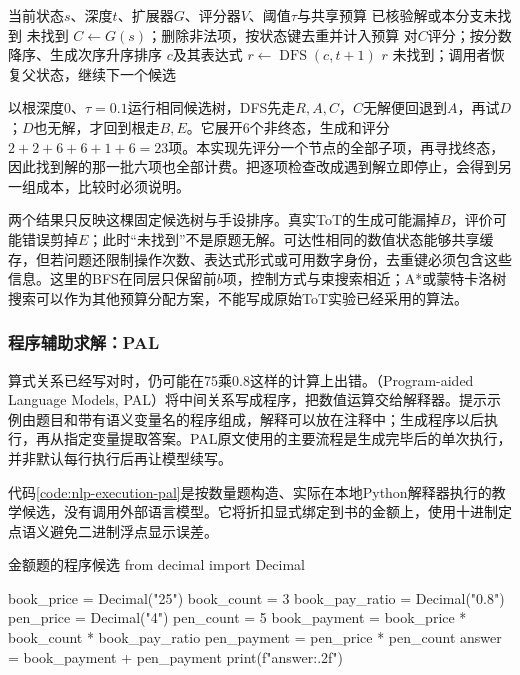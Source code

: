 \begin{algorithm}[带回溯的ToT深度优先搜索]
\label{alg:nlp-execution-tot-dfs}
\begin{algorithmic}[1]
\Require 当前状态$s$、深度$t$、扩展器$G$、评分器$V$、阈值$\tau$与共享预算
\Ensure 已核验解或本分支未找到
  \State \Return 未找到
\EndIf
\State $C\gets G(s)$；删除非法项，按状态键去重并计入预算
\State 对$C$评分；按分数降序、生成次序升序排序
    \State \Return $c$及其表达式
    \State $r\gets\operatorname{DFS}(c,t+1)$
      \State \Return $r$
    \EndIf
  \EndIf
\EndFor
\State \Return 未找到；调用者恢复父状态，继续下一个候选
\end{algorithmic}
\end{algorithm}

以根深度0、$\tau=0.1$运行相同候选树，DFS先走$R,A,C$，$C$无解便回退到$A$，再试$D$；$D$也无解，才回到根走$B,E$。它展开6个非终态，生成和评分$2+2+6+6+1+6=23$项。本实现先评分一个节点的全部子项，再寻找终态，因此找到解的那一批六项也全部计费。把逐项检查改成遇到解立即停止，会得到另一组成本，比较时必须说明。

两个结果只反映这棵固定候选树与手设排序。真实ToT的生成可能漏掉$B$，评价可能错误剪掉$E$；此时“未找到”不是原题无解。可达性相同的数值状态能够共享缓存，但若问题还限制操作次数、表达式形式或可用数字身份，去重键必须包含这些信息。这里的BFS在同层只保留前$b$项，控制方式与束搜索相近；A*或蒙特卡洛树搜索可以作为其他预算分配方案，不能写成原始ToT实验已经采用的算法。

\subsubsection{程序辅助求解：PAL}
\label{sec:nlp-execution-pal}

算式关系已经写对时，仍可能在75乘0.8这样的计算上出错。（Program-aided Language Models, PAL）将中间关系写成程序，把数值运算交给解释器。提示示例由题目和带有语义变量名的程序组成，解释可以放在注释中；生成程序以后执行，再从指定变量提取答案。PAL原文使用的主要流程是生成完毕后的单次执行，并非默认每行执行后再让模型续写。

代码\ref{code:nlp-execution-pal}是按数量题构造、实际在本地Python解释器执行的教学候选，没有调用外部语言模型。它将折扣显式绑定到书的金额上，使用十进制定点语义避免二进制浮点显示误差。

\begin{codeblock}[language=Python,label={code:nlp-execution-pal}]{金额题的程序候选}
from decimal import Decimal

book_price = Decimal("25")
book_count = 3
book_pay_ratio = Decimal("0.8")
pen_price = Decimal("4")
pen_count = 5
book_payment = book_price * book_count * book_pay_ratio
pen_payment = pen_price * pen_count
answer = book_payment + pen_payment
print(f"{answer:.2f}")
\end{codeblock}

